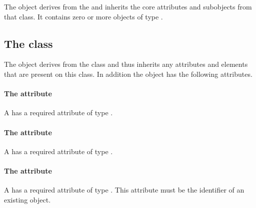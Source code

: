 
The \ListOfParametricObjects object derives from the  and
inherits the core attributes and subobjects from that class. It contains
zero or more objects of type \ParametricObject.

\subsection{The  class}
\label{parametricobject-class}




The \ParametricObject object derives from the \SBase class and thus
inherits any attributes and elements that are present on this class.
In addition the \ParametricObject object has the following attributes.

\paragraph{The \fixttspace{} attribute}

A \ParametricObject has a required attribute  of type
.


\paragraph{The \fixttspace{} attribute}

A \ParametricObject has a required attribute  of type
.


\paragraph{The \fixttspace{} attribute}

A \ParametricObject has a required attribute  of type
.
This attribute must be the identifier of an existing \DomainType object.


